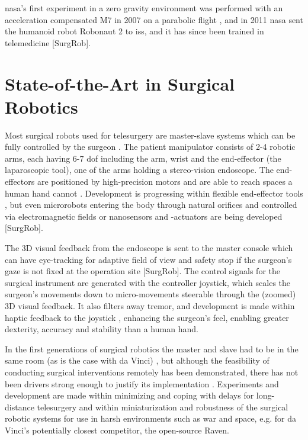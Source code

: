 \gls{nasa}'s first experiment in a zero gravity environment was performed with an acceleration compensated M7 in 2007 on a parabolic flight \citep[pp 29, 76, 85]{bib:surgical_book}, and in 2011 \gls{nasa} sent the humanoid robot Robonaut 2 to \gls{iss}, and it has since been trained in telemedicine [SurgRob].







\section{State-of-the-Art in Surgical Robotics}
Most surgical robots used for telesurgery are master-slave systems which can be fully controlled by the surgeon \citep{bib:raven_debride}. The patient manipulator consists of 2-4 robotic arms, each having 6-7 \gls{dof} \citep{bib:raven_debride} including the arm, wrist and the end-effector (the laparoscopic tool), one of the arms holding a stereo-vision \gls{endoscope}. The end-effectors are positioned by high-precision motors and are able to reach spaces a human hand cannot \citep{bib:docatadist}.
Development is progressing within flexible end-effector tools \citep[p 74]{bib:surgical_book}, but even microrobots entering the body through natural orifices and controlled via electromagnetic fields or nanosensors and -actuators are being developed [SurgRob].

The 3D visual feedback from the endoscope is sent to the master console which can have eye-tracking for adaptive field of view and safety stop if the surgeon's gaze is not fixed at the operation site [SurgRob]. The control signals for the surgical instrument are generated with the controller joystick, which scales the surgeon's movements down to micro-movements \citep{bib:intuitive_monopoly} steerable through the (zoomed) 3D visual feedback. It also filters away tremor, and development is made within haptic feedback to the joystick \citep[p 89]{bib:surgical_book}, enhancing the surgeon's feel, enabling greater dexterity, accuracy and stability than a human hand.

In the first generations of surgical robotics the master and slave had to be in the same room (as is the case with da Vinci) \citep{bib:telesurg_history,bib:raven_debride,bib:surgical_book}, but although the feasibility of conducting surgical interventions remotely has been demonstrated, there has not been drivers strong enough to justify its implementation \citep[p 38]{bib:surgical_book}. Experiments and development are made within minimizing and coping with delays for long-distance telesurgery and within miniaturization and robustness of the surgical robotic systems for use in harsh environments such as war and space, e.g. for da Vinci's potentially closest competitor, the open-source Raven.

